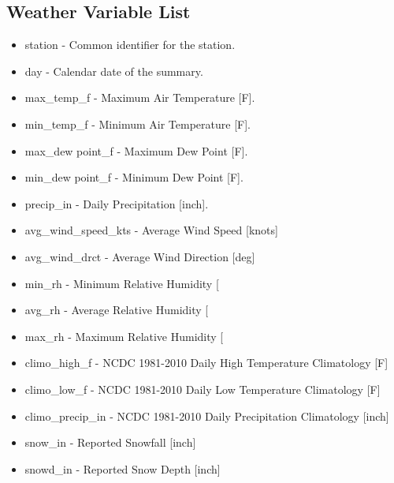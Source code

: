 \documentclass[twoside,11pt]{article}
\begin{document}
\subsection*{Weather Variable List} \label{weavarlist}
\begin{itemize}
	\item station - Common identifier for the station.
	\item day - Calendar date of the summary.
	\item max\_temp\_f - Maximum Air Temperature [F].
	\item min\_temp\_f - Minimum Air Temperature [F].
	\item max\_dew point\_f - Maximum Dew Point [F].
	\item min\_dew point\_f - Minimum Dew Point [F].
	\item precip\_in - Daily Precipitation [inch].
	\item avg\_wind\_speed\_kts - Average Wind Speed [knots]
	\item avg\_wind\_drct - Average Wind Direction [deg]
	\item min\_rh - Minimum Relative Humidity [%
	\item avg\_rh - Average Relative Humidity [%
	\item max\_rh - Maximum Relative Humidity [%
	\item climo\_high\_f - NCDC 1981-2010 Daily High Temperature Climatology [F]
	\item climo\_low\_f - NCDC 1981-2010 Daily Low Temperature Climatology [F]
	\item climo\_precip\_in - NCDC 1981-2010 Daily Precipitation Climatology [inch]
	\item snow\_in - Reported Snowfall [inch]
	\item snowd\_in - Reported Snow Depth [inch]
\end{itemize}
\end{document}
